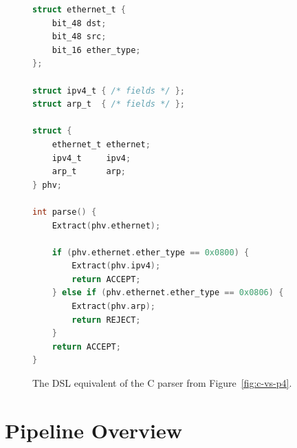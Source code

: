 \begin{figure}[H]
\centering
\begin{minipage}{0.55\textwidth}
\begin{lstlisting}[style=codeside, language=C]
struct ethernet_t {
    bit_48 dst;
    bit_48 src;
    bit_16 ether_type;
};

struct ipv4_t { /* fields */ };
struct arp_t  { /* fields */ };

struct {
    ethernet_t ethernet;
    ipv4_t     ipv4;
    arp_t      arp;
} phv;

int parse() {
    Extract(phv.ethernet);

    if (phv.ethernet.ether_type == 0x0800) {
        Extract(phv.ipv4);
        return ACCEPT;
    } else if (phv.ethernet.ether_type == 0x0806) {
        Extract(phv.arp);
        return REJECT;
    }
    return ACCEPT;
}
\end{lstlisting}
\end{minipage}
\caption{The DSL equivalent of the C parser from Figure~\ref{fig:c-vs-p4}.}
\label{fig:dsl-example}
\end{figure}

\section{Pipeline Overview}
\label{sec:pipeline-overview}

